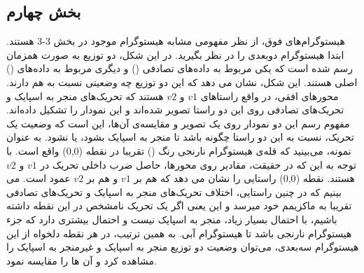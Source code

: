 \documentclass[12pt,onecolumn,a4paper,fleqn]{article}
\begin{document}
\subsection{بخش چهارم}

 \begin{figure}[ht]
	\centering
\end{figure}

هیستوگرام‌های فوق، از نظر مفهومی مشابه هیستوگرام موجود در بخش 3-3 هستند. ابتدا هیستوگرام دوبعدی را در نظر بگیرید. در این شکل، دو توزیع به صورت همزمان رسم شده است که یکی مربوط به داده‌های تصادفی () و دیگری مربوط به داده‌های () اصلی هستند. این شکل، نشان می دهد که این دو توزیع چه وضعیتی نسبت به هم دارند. محورهای افقی، در واقع راستاهای $ v1 $ و $ v2 $ هستند که تحریک‌های منجر به اسپایک و تحریک‌های تصادفی روی این دو راستا تصویر شده‌اند و این نمودار را تشکیل داده‌اند. مفهوم رسم این دو نمودار روی یک تصویر و مقایسه‌ی آن‌ها، این است که وضعیت یک تحریک، نسبت به این دو راستا چگونه باشد تا منجر به اسپایک بشود، یا نشود. به عنوان نمونه، می‌بینید که قله‌ی هیستوگرام نارنجی رنگ () تقریبا در نقطه (0,0) واقع است. با توجه به این که در حقیقت، مقادیر روی محورها، حاصل ضرب داخلی تحریک در $ v1 $ و $ v2 $ هستند. نقطه (0,0) راستایی را نشان می دهد که هم بر $ v1 $ و هم بر $ v2 $ عمود است. می بینیم که در چنین راستایی، اختلاف تحریک‌های منجر به اسپایک و تحریک‌های تصادفی تقریبا به ماکزیمم خود میرسد و این یعنی اگر یک تحریک نامشخص در این نقطه داشته باشیم، با احتمال بسیار زیاد، منجر به اسپایک نیست و احتمال بیشتری دارد که جزء هیستوگرام نارنجی باشد تا هیستوگرام آبی. به همین ترتیب، در هر نقطه دلخواه از این هیستوگرام سه‌بعدی، می‌توان وضعیت دو توزیع منجر به اسپایک و غیرمنجر به اسپایک را مشاهده کرد و آن ها را مقایسه نمود.
\end{document}
